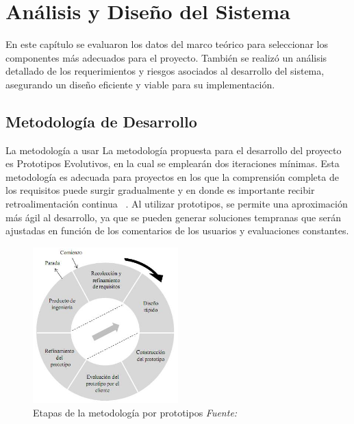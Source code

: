 \chapter{Análisis y Diseño del Sistema}\label{ch:Análisis y diseño del sistema}
En este capítulo se evaluaron los datos del marco teórico para seleccionar los componentes más adecuados para el proyecto. También se realizó un análisis detallado de los requerimientos y riesgos asociados al desarrollo del sistema, asegurando un diseño eficiente y viable para su implementación.

\section{Metodología de Desarrollo}
La metodología a usar	La metodología propuesta para el desarrollo del proyecto es Prototipos Evolutivos, en la cual se emplearán dos iteraciones mínimas. Esta metodología es adecuada para proyectos en los que la comprensión completa de los requisitos puede surgir gradualmente y en donde es importante recibir retroalimentación continua ~\cite{MetodologíasDeDesarrollo2015}. Al utilizar prototipos, se permite una aproximación más ágil al desarrollo, ya que se pueden generar soluciones tempranas que serán ajustadas en función de los comentarios de los usuarios y evaluaciones constantes.

\begin{figure}[H]
	\centering
	\includegraphics[width=0.5\textwidth]{img/chapter04/prototipo.png}
	\caption{Etapas de la metodología por prototipos \newline \centering \textit{Fuente: ~\cite{MetodologíasDeDesarrollo2015}}}
	\label{fig:prototpios-metodología}  %
\end{figure}


